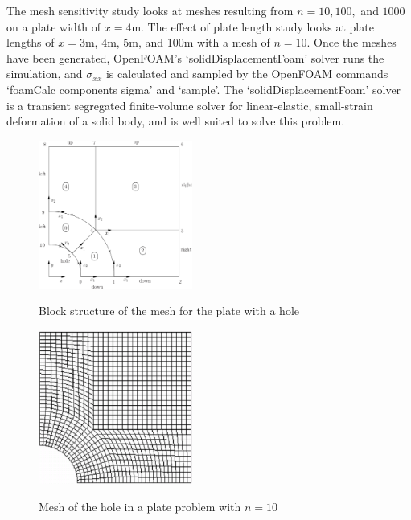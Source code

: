 \documentclass[twocolumn,10pt]{asme2ej}
\begin{document}
 The mesh sensitivity study looks at meshes resulting from $n = 10, 100, $ and $1000$ on a plate width of $x = 4$m. The effect of plate length study looks at plate lengths of $x = 3$m, 4m, 5m, and 100m with a mesh of $n = 10$. Once the meshes have been generated, OpenFOAM's `solidDisplacementFoam' solver runs the simulation, and $\sigma_{xx}$ is calculated and sampled by the OpenFOAM commands `foamCalc components sigma' and `sample'. The `solidDisplacementFoam' solver is a transient segregated finite-volume solver for linear-elastic, small-strain deformation of a solid body, and is well suited to solve this problem.
\begin{figure}[thb]
\begin{center}
\includegraphics[width=0.45\textwidth]{figure/user149x.png}
\caption{Block structure of the mesh for the plate with a hole \cite{ctfm_1}}
\label{blocks}
\includegraphics[width=0.45\textwidth]{figure/user152x.png}
\caption{Mesh of the hole in a plate problem with $n = 10$ \cite{ctfm_1}}
\label{mesh}
\end{center}
\end{figure}

\end{document}
